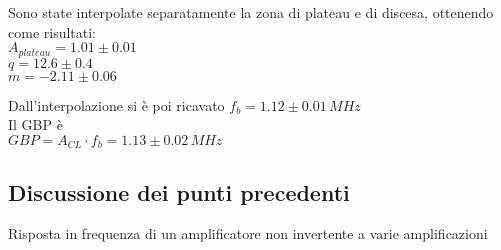 Sono state interpolate separatamente la zona di plateau e di discesa, ottenendo come risultati:\\
$A_{plateau}=1.01 \pm 0.01$\\
$q = 12.6 \pm 0.4$\\
$m  = -2.11 \pm 0.06$

Dall'interpolazione si è poi ricavato 
$f_b=1.12\pm 0.01 \,MHz $\\
Il GBP è\\
$GBP=A_{CL} \cdot f_b  = 1.13 \pm 0.02 \,MHz$

\subsection{Discussione dei punti precedenti}

\begin{grafico}
 \centering 
  
 \caption{Risposta in frequenza di un amplificatore non invertente a varie amplificazioni} 
 \label{gr:amp_noninv_all.tex} 
\end{grafico}


